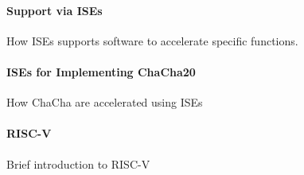 \paragraph{Support via ISEs}
How ISEs supports software to accelerate specific functions.

\paragraph{ISEs for Implementing ChaCha20}
How ChaCha are accelerated using ISEs  

\paragraph{RISC-V}
Brief introduction to RISC-V 


